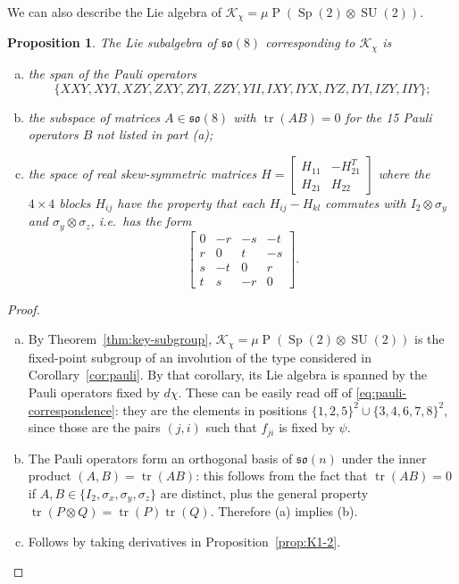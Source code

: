 \documentclass[reqno]{amsart}
\newtheorem{proposition}[theorem]{Proposition}
\theoremstyle{definition} \newtheorem{example}[theorem]{Example}
\newcommand{\SU}{\operatorname{SU}}
\newcommand{\Sp}{\operatorname{Sp}}
\newcommand{\so}{\mathfrak{so}}
\newcommand{\tr}{\operatorname{tr}}
\renewcommand{\P}{\operatorname{P}}
\newcommand{\K}{\mathcal{K}}
\begin{document}
We can also describe the Lie algebra of $\K_\chi = \mu \P(\Sp(2) \otimes \SU(2))$.
\begin{proposition}
The Lie subalgebra of $\so(8)$ corresponding to $\K_\chi$ is
\begin{enumerate}[(a)]
\item the span of the Pauli operators
\begin{equation*}
\{XXY,XYI,XZY,ZXY,ZYI,ZZY,YII,IXY,IYX,IYZ,IYI,IZY,IIY\};
\end{equation*}
\item the subspace of matrices $A \in \so(8)$ with $\tr(AB) = 0$ for the 15 Pauli operators $B$ not listed in part (a);
\item the space of real skew-symmetric matrices $H = \left[ \begin{smallmatrix} H_{11} & -H_{21}^T \\ H_{21} & H_{22} \end{smallmatrix} \right]$ where the $4 \times 4$ blocks $H_{ij}$ have the property that each $H_{ij} - H_{kl}$ commutes with $I_2 \otimes \sigma_y$ and $\sigma_y \otimes \sigma_z$, i.e.\ has the form
\begin{equation*}
\begin{bmatrix}
0 & -r & -s & -t\\ 
r & 0  & t & -s\\
s & -t & 0 & r\\
t & s  & -r & 0
\end{bmatrix}.
\end{equation*}
\end{enumerate}
\end{proposition}

\begin{proof} \hfill
\begin{enumerate}[(a)]
\item By Theorem~\ref{thm:key-subgroup}, $\K_\chi = \mu\P(\Sp(2) \otimes \SU(2))$ is the fixed-point subgroup of an involution of the type considered in Corollary~\ref{cor:pauli}. By that corollary, its Lie algebra is spanned by the Pauli operators fixed by $d\chi$. These can be easily read off of \eqref{eq:pauli-correspondence}: they are the elements in positions $\{1,2,5\}^2 \cup \{3,4,6,7,8\}^2$, since those are the pairs $(j,i)$ such that $f_{ji}$ is fixed by $\psi$.

\item The Pauli operators form an orthogonal basis of $\so(n)$ under the inner product $(A,B) = \tr(AB)$: this follows from the fact that $\tr(AB) = 0$ if $A,B \in \{I_2,\sigma_x,\sigma_y,\sigma_z\}$ are distinct, plus the general property $\tr(P \otimes Q) = \tr(P)\tr(Q)$. Therefore (a) implies (b).

\item Follows by taking derivatives in Proposition~\ref{prop:K1-2}.
\end{enumerate}
\end{proof}
\end{document}
